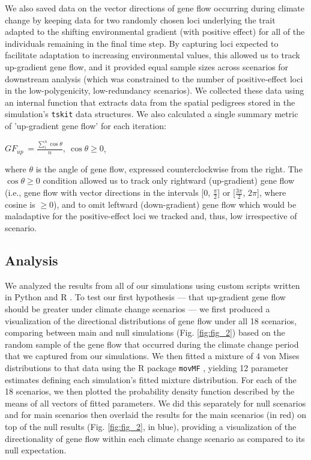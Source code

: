 \documentclass[9pt,twocolumn,twoside,lineno]{new_article}
\begin{document}
We also saved data on the vector directions
of gene flow occurring during climate change by keeping 
data for two randomly chosen loci underlying the trait adapted to the shifting environmental gradient (with positive effect) for all of the individuals remaining in the final time step.
By capturing loci expected to facilitate 
adaptation to increasing environmental values, this allowed us to track up-gradient gene flow, and it  provided equal sample sizes across scenarios for downstream analysis (which was 
constrained to the number of positive-effect loci in
the low-polygenicity, low-redundancy scenarios). 
We collected these data using an internal function
that extracts data from the spatial pedigrees stored in the
simulation's \texttt{tskit} \cite{kelleher} data structures.
We also calculated a single summary metric of 'up-gradient gene flow' for each iteration:

$GF_{up}\ = \frac{\sum\limits_{i}^{n}\cos\theta}{n},\ \cos\theta\geq0$,

where $\theta$ is the angle of gene flow, expressed counterclockwise from the right.
The $\cos\theta\geq0$ condition allowed us to track only rightward (up-gradient) gene flow (i.e., gene flow with
vector directions in the intervals [0, $\frac{\pi}{2}$] or [$\frac{3\pi}{2}$, $2\pi$], where cosine is $\geq{0}$),
and to omit leftward (down-gradient) gene flow which would be maladaptive for
the positive-effect loci we tracked and, thus, low irrespective of scenario.


\subsection*{Analysis}

We analyzed the results from all of our simulations using custom scripts written in 
Python \cite{rossum} and R \cite{r_core_team}. To test our first hypothesis --- that up-gradient gene flow should be greater under climate change scenarios --- we first produced a visualization of the directional 
distributions of gene flow under all 18 scenarios, comparing between main
and null simulations (Fig. \ref{fig:fig_2}) based on the random 
sample of the gene flow that occurred during the climate change period that we captured from our simulations. We then fitted a mixture of 4 von Mises distributions to that data
using the R package \texttt{movMF} \cite{hornik},
yielding 12 parameter estimates defining each simulation's fitted mixture distribution. For each of 
the 18 scenarios, we then plotted the probability density function 
described by the means of all vectors of fitted parameters. We did this 
separately for null scenarios and for main scenarios then overlaid the results for the main scenarios (in red)
on top of the null results (Fig. \ref{fig:fig_2}, in blue), providing a visualization of the directionality of gene flow within each 
climate change scenario as compared to its null expectation.
\end{document}
